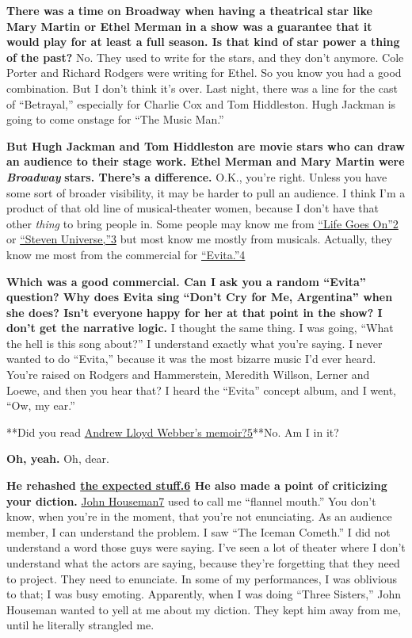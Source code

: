 \textbf{There was a time on Broadway when having a theatrical star like
Mary Martin or Ethel Merman in a show was a guarantee that it would play
for at least a full season. Is that kind of star power a thing of the
past?} No. They used to write for the stars, and they don't anymore.
Cole Porter and Richard Rodgers were writing for Ethel. So you know you
had a good combination. But I don't think it's over. Last night, there
was a line for the cast of ``Betrayal,'' especially for Charlie Cox and
Tom Hiddleston. Hugh Jackman is going to come onstage for ``The Music
Man.''

\textbf{But Hugh Jackman and Tom Hiddleston are movie stars who can draw
an audience to their stage work. Ethel Merman and Mary Martin were}
\emph{\textbf{Broadway}} \textbf{stars. There's a difference.} O.K.,
you're right. Unless you have some sort of broader visibility, it may be
harder to pull an audience. I think I'm a product of that old line of
musical-theater women, because I don't have that other \emph{thing} to
bring people in. Some people may know me from
\href{http://nytimes3xbfgragh.onion\#tooltip-2}{``Life Goes On''2} or
\href{http://nytimes3xbfgragh.onion\#tooltip-3}{``Steven Universe,''3}
but most know me mostly from musicals. Actually, they know me most from
the commercial for
\href{http://nytimes3xbfgragh.onion\#tooltip-4}{``Evita.''4}

\textbf{Which was a good commercial. Can I ask you a random ``Evita''
question? Why does Evita sing ``Don't Cry for Me, Argentina'' when she
does? Isn't everyone happy for her at that point in the show? I don't
get the narrative logic.} I thought the same thing. I was going, ``What
the hell is this song about?'' I understand exactly what you're saying.
I never wanted to do ``Evita,'' because it was the most bizarre music
I'd ever heard. You're raised on Rodgers and Hammerstein, Meredith
Willson, Lerner and Loewe, and then you hear that? I heard the ``Evita''
concept album, and I went, ``Ow, my ear.''

**Did you read \href{http://nytimes3xbfgragh.onion\#tooltip-5}{Andrew
Lloyd Webber's memoir?5}**No. Am I in it?

\textbf{Oh, yeah.} Oh, dear.

\textbf{He rehashed \href{http://nytimes3xbfgragh.onion\#tooltip-6}{the
expected stuff.6} He also made a point of criticizing your diction.}
\href{http://nytimes3xbfgragh.onion\#tooltip-7}{John Houseman7} used to
call me ``flannel mouth.'' You don't know, when you're in the moment,
that you're not enunciating. As an audience member, I can understand the
problem. I saw ``The Iceman Cometh.'' I did not understand a word those
guys were saying. I've seen a lot of theater where I don't understand
what the actors are saying, because they're forgetting that they need to
project. They need to enunciate. In some of my performances, I was
oblivious to that; I was busy emoting. Apparently, when I was doing
``Three Sisters,'' John Houseman wanted to yell at me about my diction.
They kept him away from me, until he literally strangled me.

